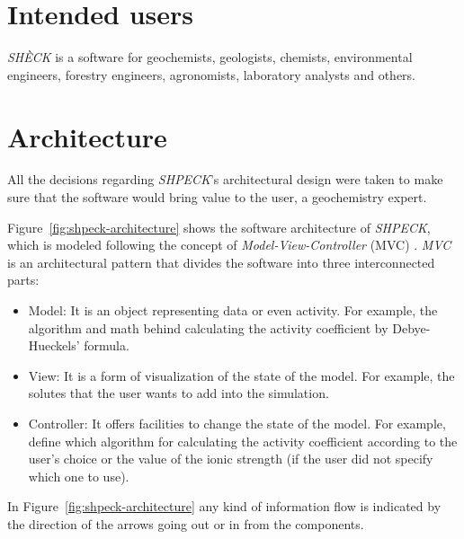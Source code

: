\section{Intended users}
\emph{SHÈCK} is a software for geochemists, geologists, chemists, environmental engineers, forestry engineers, agronomists, laboratory analysts and others. 

\section{Architecture}

All the decisions regarding \emph{SHPECK}'s architectural design  were taken to make sure that the software would bring value to the user, a geochemistry expert. 

Figure~\ref{fig:shpeck-architecture} shows the software architecture of \emph{SHPECK}, which is modeled following the concept of \emph{Model-View-Controller} (MVC) \cite{Gamma:94}. \emph{MVC} is an architectural pattern that divides the software into three interconnected parts:
\begin{itemize}
\item Model: It is an object representing data or even activity. For example, the algorithm and math behind calculating the activity coefficient by Debye-Hueckels' formula.
\item View: It is a form of visualization of the state of the model. For example, the solutes that the user wants to add into the simulation.
\item Controller: It offers facilities to change the state of the model. For example, define which algorithm for calculating the activity coefficient according to the user's choice or the value of the ionic strength (if the user did not specify which one to use).
\end{itemize}
In Figure~\ref{fig:shpeck-architecture} any kind of information flow is indicated by the direction of the arrows going out or in from the components.

